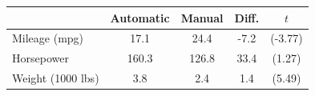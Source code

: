 \begin{tabular}{l*{4}{c}}
\doublerule
                &Automatic&   Manual&           Diff.&      $t$\\
\midrule
Mileage (mpg)   &     17.1&     24.4&  -7.2\sym{***}&  (-3.77)\\
Horsepower      &    160.3&    126.8&            33.4&   (1.27)\\
Weight (1000 lbs)&      3.8&      2.4&   1.4\sym{***}&   (5.49)\\
\midrule
\end{tabular}
